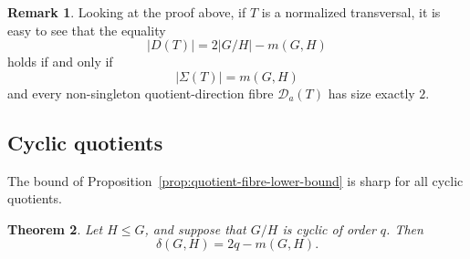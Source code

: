 \documentclass[reqno]{amsart}
\numberwithin{equation}{section}
\newtheorem{theorem}{Theorem}[section]
\theoremstyle{definition}
\newtheorem{remark}[theorem]{Remark}
\begin{document}
\begin{remark}
Looking at the proof above, if $T$ is a normalized
transversal, it is easy to see that the equality
\[
  |D(T)|=2|G/H|-m(G,H)
\]
holds if and only if
\[
  |\Sigma(T)|=m(G,H)
\]
and every non-singleton quotient-direction fibre $\mathcal D_a(T)$ has size
exactly $2$.
\end{remark}

\subsection{Cyclic quotients}
\label{subsec:cyclic-quotients}

The bound of Proposition~\ref{prop:quotient-fibre-lower-bound} is sharp for all
cyclic quotients.
\begin{theorem}
\label{thm:cyclic-quotient-formula}
Let $H\leq G$, and suppose that $G/H$ is cyclic of order $q$.  Then
\[
  \delta(G,H)=2q-m(G,H).
\]
\end{theorem}
\end{document}
